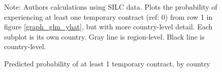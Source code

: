 \begin{figure}[htp!]
    \caption{Predicted probability of at least 1 temporary contract, by country}
    \label{graph_eu_silc_glm_yhat_ever_country}
    \footnotesize{Note: Authors calculations using SILC data.  Plots the probability of experiencing at least one temporary contract (ref: 0) from row 1 in figure \ref{graph_glm_yhat}, but with more country-level detail.  Each subplot is its own country.  Gray line is region-level.  Black line is country-level.}
\end{figure}

